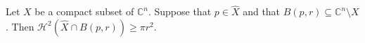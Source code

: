 
Let $X$ be a compact subset of $\mathbb{C}^n$. Suppose that $p \in \hat{X}$ and that $B(p, r) \subseteq \mathbb{C}^n \setminus X$. Then $\mathcal{H}^2(\hat{X} \cap B(p, r)) \geq \pi r^2$.
